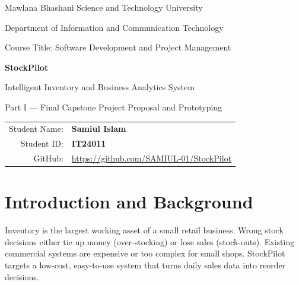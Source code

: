 \documentclass[11pt,a4paper]{article}
\begin{document}
\begin{titlepage}\centering\vspace*{2cm}
{\Large Mawlana Bhashani Science and Technology University\par}
{\large Department of Information and Communication Technology\par}\vspace{1.5cm}
{\large Course Title: Software Development and Project Management\par}\vspace{.2cm}{\large Course Code: ICT 3108\par}\vspace{1cm}
{\Huge\bfseries StockPilot\par}\vspace{.3cm}
{\Large Intelligent Inventory and Business Analytics System\par}\vspace{.5cm}
{\large Part I --- Final Capstone Project Proposal and Prototyping\par}\vspace{2cm}
\begin{tabular}{rl}
Student Name: & \textbf{Samiul Islam}\\
Student ID: & \textbf{IT24011}\\
GitHub: & \url{https://github.com/SAMIUL-01/StockPilot}\\
\end{tabular}
\end{titlepage}
\tableofcontents\newpage

\begin{abstract}
Small retail shops in Bangladesh usually track stock in notebooks or spreadsheets. This causes stock-outs, expired or dead stock, and no clear view of profit. \textbf{StockPilot} is an inventory management system that goes beyond storing stock counts. It records every stock movement, calculates gross profit per sale, and gives rule-based \emph{Smart Restock} advice explaining what to reorder, how much, and why. This proposal presents the problem, objectives, scope, requirements, process model, schedule with Gantt chart, six UML diagrams, and a working Java prototype with a simple Swing interface built from seven classes.
\end{abstract}

\section{Introduction and Background}
Inventory is the largest working asset of a small retail business. Wrong stock decisions either tie up money (over-stocking) or lose sales (stock-outs). Existing commercial systems are expensive or too complex for small shops. StockPilot targets a low-cost, easy-to-use system that turns daily sales data into reorder decisions.
\end{document}
